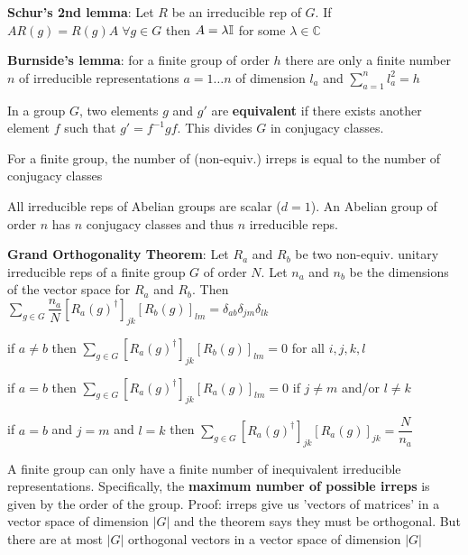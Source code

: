 \begin{squishlist}
    \item \textbf{Schur's 2nd lemma}: Let $R$ be an irreducible rep of $G$. If $A R(g) = R(g) A \; \forall g \in G$ then $A = \lambda \mathbb{I} $ for some $\lambda \in \mathbb{C}$
    
    \item \textbf{Burnside's lemma}: for a finite group of order $h$ there are only a finite number $n$ of irreducible representations $a = 1 \ldots n$ of dimension $l_a$ and $\sum_{a=1}^n l_a^2 = h$
    \item In a group $G$, two elements $g$ and $g'$ are \textbf{equivalent} if there exists another element $f$ such that $g' = f^{-1} g f$. This divides $G$ in conjugacy classes.
    \item For a finite group, the number of (non-equiv.) irreps is equal to the number of conjugacy classes
    \item All irreducible reps of Abelian groups are scalar ($d=1$). An Abelian group of order $n$ has $n$ conjugacy classes and thus $n$ irreducible reps.
    
    \item \textbf{Grand Orthogonality Theorem}: Let $R_a$ and $R_b$ be two non-equiv. unitary irreducible reps of a finite group $G$ of order $N$.
    Let $n_a$ and $n_b$ be the dimensions of the vector space for $R_a$ and $R_b$. Then \\
    $\sum_{g\in G} \dfrac{n_a}{N} \left[R_a(g)^{\dagger}\right]_{jk} \left[R_b(g)\right]_{lm} = \delta_{ab} \delta_{jm} \delta_{lk}$
    \begin{squishitemize}
        \item if $a \neq b$ then $\sum_{g\in G} \left[R_a(g)^{\dagger}\right]_{jk} \left[R_b(g)\right]_{lm} = 0$ for all $i,j,k,l$
        \item if $a = b$ then $\sum_{g\in G} \left[R_a(g)^{\dagger}\right]_{jk} \left[R_a(g)\right]_{lm} = 0$ if $j \neq m$ and/or $l \neq k$
        \item if $a=b$ and $j=m$ and $l=k$ then $\sum_{g\in G} \left[R_a(g)^{\dagger}\right]_{jk} \left[R_a(g)\right]_{jk} = \dfrac{N}{n_a}$
    \end{squishitemize}

    \item A finite group can only have a finite number of inequivalent irreducible
    representations. Specifically, the \textbf{maximum number of possible irreps} is given by the order of the group.
    Proof: irreps give us 'vectors of matrices' in a vector space of dimension $|G|$ and the theorem says they must be orthogonal. But there are at most $|G|$ orthogonal vectors in a vector space of dimension $|G|$


\end{squishlist}
